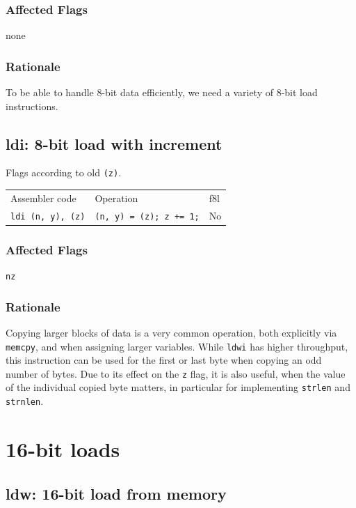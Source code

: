 \documentclass{book}
\begin{document}
\subsubsection*{Affected Flags}

none

\subsubsection*{Rationale}

To be able to handle 8-bit data efficiently, we need a variety of 8-bit load instructions.

\subsection{ldi: 8-bit load with increment}

Flags according to old \texttt{(z)}.

\begin{tabular}{l l l}
Assembler code           & Operation                      & f8l \\
\texttt{ldi (n, y), (z)} & \texttt{(n, y) = (z); z += 1;} & No \\
\end{tabular}

\subsubsection*{Affected Flags}

\texttt{nz}

\subsubsection*{Rationale}

Copying larger blocks of data is a very common operation, both explicitly via \texttt{memcpy}, and when assigning larger variables. While \texttt{ldwi} has higher throughput, this instruction can be used for the first or last byte when copying an odd number of bytes. Due to its effect on the \texttt{z} flag, it is also useful, when the value of the individual copied byte matters, in particular for implementing \texttt{strlen} and \texttt{strnlen}.


\section{16-bit loads}

\subsection{ldw: 16-bit load from memory}
\end{document}
